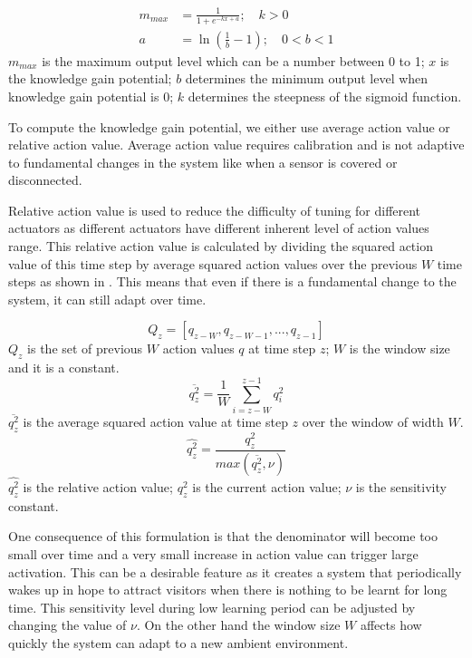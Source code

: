 \begin{subequations}\label{eqn:map_sigmoid}
	\begin{flalign} 
		m_{max} &= \frac{1}{1+e^{-kx+a}}; \quad k > 0 \\
		a &= \ln{(\frac{1}{b}-1)}; \quad 0 < b < 1
	\end{flalign}
\end{subequations}
$m_{max}$ is the maximum output level which can be a number between 0 to 1; $x$ is the knowledge gain potential; $b$ determines the minimum output level when knowledge gain potential is 0; $k$ determines the steepness of the sigmoid function. 

To compute the knowledge gain potential, we either use average action value or relative action value. Average action value requires calibration and is not adaptive to fundamental changes in the system like when a sensor is covered or disconnected. 

Relative action value is used to reduce the difficulty of tuning for different actuators as different actuators have different inherent level of action values range. This relative action value is calculated by dividing the squared action value of this time step by average squared action values over the previous $W$ time steps as shown in . This means that even if there is a fundamental change to the system, it can still adapt over time.  

\begin{equation}\label{eqn:action_val_set}
	Q_z = [q_{z-W}, q_{z-W-1}, ... , q_{z-1}]
\end{equation}
$Q_z$ is the set of previous $W$ action values $q$ at time step $z$; $W$ is the window size and it is a constant.
\begin{equation}\label{eqn:avg_action_val}
	\overline{q^2_z} = \frac{1}{W}\displaystyle\sum_{i=z-W}^{z-1} q_i^2
\end{equation}
$\overline{q^2_z}$ is the average squared action value at time step $z$ over the window of width $W$.
\begin{equation}\label{eqn:relative_action_val}
	\widehat{q^2_z} = \frac{q_z^2}{max(\overline{q^2_z}, \nu)}
\end{equation}
$\widehat{q^2_z}$ is the relative action value; $q_z^2$ is the current action value; $\nu$ is the sensitivity constant.

One consequence of this formulation is that the denominator will become too small over time and a very small increase in action value can trigger large activation. This can be a desirable feature as it creates a system that periodically wakes up in hope to attract visitors when there is nothing to be learnt for long time. This sensitivity level during low learning period can be adjusted by changing the value of $\nu$. On the other hand the window size $W$ affects how quickly the system can adapt to a new ambient environment. 


